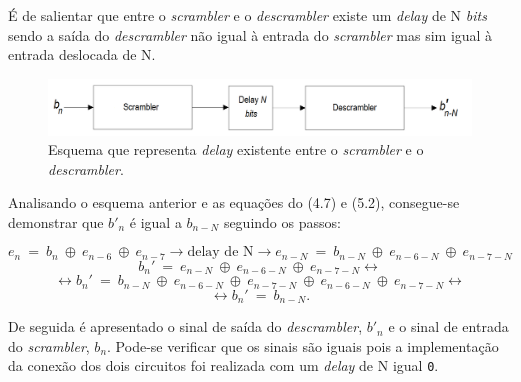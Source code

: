 \documentclass[11pt]{article}
\numberwithin{equation}{section}
\begin{document}
É de salientar que entre o \textit{scrambler} e o \textit{descrambler} existe um \textit{delay} de N \textit{bits} sendo a saída do \textit{descrambler} não igual à entrada do \textit{scrambler} mas sim igual à entrada deslocada de N.

\begin{figure}[H]
	\centering
	\includegraphics[keepaspectratio=true, scale=0.30]{teoricas/Ndelay}
	\caption{Esquema que representa \textit{delay} existente entre o \textit{scrambler} e o \textit{descrambler}.}
	\vspace{-0.8em}
\end{figure}

Analisando o esquema anterior e as equações do (4.7) e (5.2), consegue-se demonstrar que $b'_n$ é igual a $b_{n-N}$ seguindo os passos:

\vspace{-5mm}
\begin{equation}
e_n~= ~b_n~\oplus~e_{n-6}~\oplus~e_{n-7} \rightarrow \text{delay de N} \rightarrow e_{n-N}~= ~b_{n-N}~\oplus~e_{n-6-N}~\oplus~e_{n-7-N}
\end{equation}  
\vspace{-7.5mm}
\begin{equation}
 b_n'~= ~e_{n-N}~\oplus~e_{n-6-N}~\oplus~e_{n-7-N} \leftrightarrow
\end{equation}  
\vspace{-7.5mm}
\begin{equation}
\leftrightarrow b_n'~= ~b_{n-N}~\oplus~e_{n-6-N}~\oplus~e_{n-7-N}~\oplus~e_{n-6-N}~\oplus~e_{n-7-N} \leftrightarrow
\end{equation}  
\vspace{-7.5mm}
\begin{equation}
\leftrightarrow b_n'~= ~b_{n-N}.
\end{equation}  

De seguida é apresentado o sinal de saída do \textit{descrambler}, $b'_n$ e o sinal de entrada do \textit{scrambler}, $b_n$. Pode-se verificar que os sinais são iguais pois a implementação da conexão dos dois circuitos foi realizada com um \textit{delay} de N igual \texttt{0}.
\end{document}
